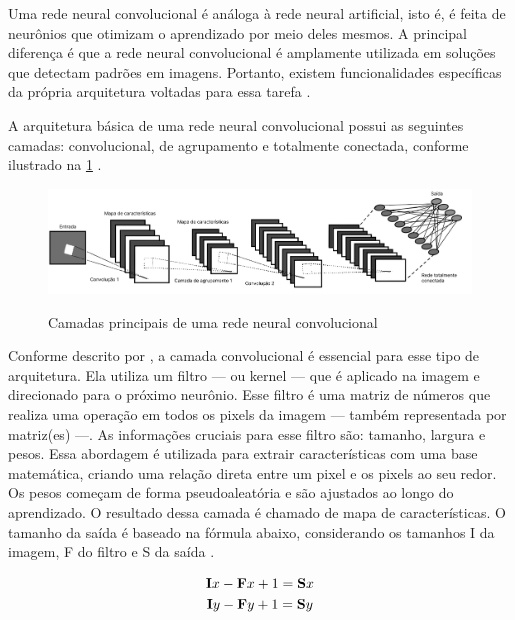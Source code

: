 
Uma rede neural convolucional é análoga à rede neural artificial, isto é, é feita de neurônios que otimizam o aprendizado por meio deles mesmos. A principal diferença é que a rede neural convolucional é amplamente utilizada em soluções que detectam padrões em imagens. Portanto, existem funcionalidades específicas da própria arquitetura voltadas para essa tarefa \space\cite{oshea2015introduction}.

A arquitetura básica de uma rede neural convolucional possui as seguintes camadas: convolucional, de agrupamento e totalmente conectada, conforme ilustrado na \cref{fig:arquitetura_cnn} \space\cite{dp_overview}.

\begin{figure}[ht]
\caption{Camadas principais de uma rede neural convolucional}
\centering %
\includegraphics[width=15cm]{figures/arquitetura_cnn.png} %
\label{fig:arquitetura_cnn}
\end{figure}


Conforme descrito por , a camada convolucional é essencial para esse tipo de arquitetura. Ela utiliza um filtro — ou kernel — que é aplicado na imagem e direcionado para o próximo neurônio. Esse filtro é uma matriz de números que realiza uma operação em todos os pixels da imagem — também representada por matriz(es) —. As informações cruciais para esse filtro são: tamanho, largura e pesos. Essa abordagem é utilizada para extrair características com uma base matemática, criando uma relação direta entre um pixel e os pixels ao seu redor. Os pesos começam de forma pseudoaleatória e são ajustados ao longo do aprendizado. O resultado dessa camada é chamado de mapa de características. O tamanho da saída é baseado na fórmula abaixo, considerando os tamanhos I da imagem, F do filtro e S da saída \space\cite{computation11030052}.

\begin{gather}
    \mathbf{I}x - \mathbf{F}x + 1 = \mathbf{S}x \notag \\
    \mathbf{I}y - \mathbf{F}y + 1 = \mathbf{S}y
\end{gather}


